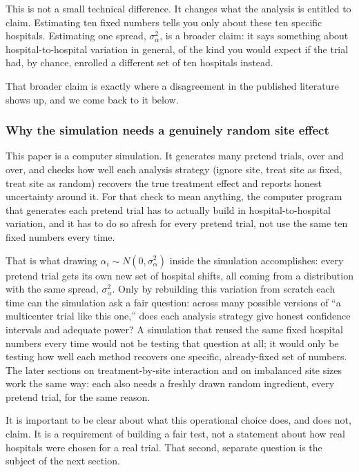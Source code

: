 \documentclass[
  11pt,
]{article}
\begin{document}
This is not a small technical difference. It changes what
the analysis is entitled to claim. Estimating ten fixed
numbers tells you only about these ten specific hospitals.
Estimating one spread, \(\sigma^2_\alpha\), is a broader claim:
it says something about hospital-to-hospital variation in
general, of the kind you would expect if the trial had, by
chance, enrolled a different set of ten hospitals instead.

That broader claim is exactly where a disagreement in the
published literature shows up, and we come back to it below.

\subsubsection{Why the simulation needs a genuinely random site effect}\label{why-the-simulation-needs-a-genuinely-random-site-effect}

This paper is a computer simulation. It generates many
pretend trials, over and over, and checks how well each
analysis strategy (ignore site, treat site as fixed, treat
site as random) recovers the true treatment effect and
reports honest uncertainty around it. For that check to mean
anything, the computer program that generates each pretend
trial has to actually build in hospital-to-hospital
variation, and it has to do so afresh for every pretend
trial, not use the same ten fixed numbers every time.

That is what drawing \(\alpha_i \sim N(0, \sigma^2_\alpha)\)
inside the simulation accomplishes: every pretend trial gets
its own new set of hospital shifts, all coming from a
distribution with the same spread, \(\sigma^2_\alpha\). Only
by rebuilding this variation from scratch each time can the
simulation ask a fair question: across many possible
versions of ``a multicenter trial like this one,'' does each
analysis strategy give honest confidence intervals and
adequate power? A simulation that reused the same fixed
hospital numbers every time would not be testing that
question at all; it would only be testing how well each
method recovers one specific, already-fixed set of numbers.
The later sections on treatment-by-site interaction and on
imbalanced site sizes work the same way: each also needs a
freshly drawn random ingredient, every pretend trial, for the
same reason.

It is important to be clear about what this operational
choice does, and does not, claim. It is a requirement of
building a fair test, not a statement about how real
hospitals were chosen for a real trial. That second,
separate question is the subject of the next section.
\end{document}
